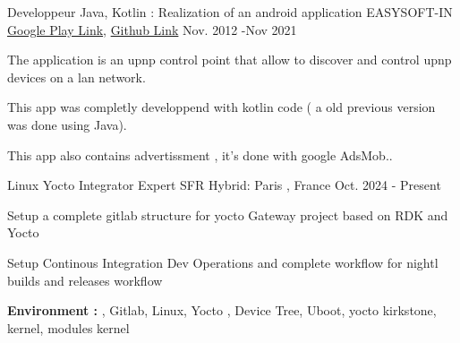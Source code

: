 \documentclass[11pt, a4paper]{awesome-cv} %
\begin{document}
\begin{cventries}
    \cventry
    {Developpeur Java, Kotlin : Realization of an android application} %
    {EASYSOFT-IN} %
    { \href{https://play.google.com/store/apps/details?id=com.easysoftin.easyup}{Google Play Link}, \href{https://bitbucket.org/easysoftin/easyup/src/master/}{Github Link} } %
    {Nov. 2012 -Nov 2021} %
    { %
        \begin{cvitems}
            \item {The application is an upnp control point that allow to discover and control upnp devices on a lan network.}
            \item {This app was completly developpend with kotlin code ( a old previous version was done using Java).}
            \item {This app also contains advertissment , it's done with google AdsMob..}
        \end{cvitems}
    }



    \cventry
    {Linux Yocto Integrator Expert} %
    {SFR} %
    {Hybrid: Paris , France} %
    {Oct. 2024 - Present} %
    { %
        \begin{cvitems}
            \item {Setup a complete gitlab structure for yocto Gateway project based on RDK and Yocto}
            \item {Setup Continous Integration Dev Operations and complete workflow for nightl builds and releases workflow}
            \item { \textbf{Environment :} ,  Gitlab, Linux, Yocto , Device Tree, Uboot, yocto kirkstone, kernel, modules kernel}
        \end{cvitems}
    }



\end{cventries}
\end{document}
